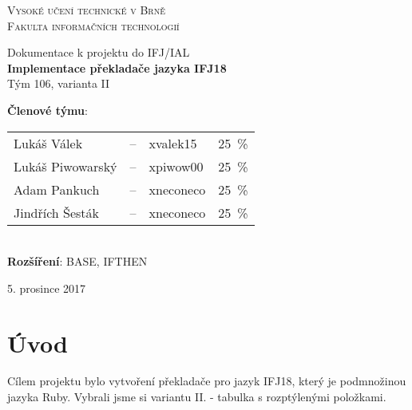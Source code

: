 \documentclass[11pt, a4paper]{article}
\begin{document}
\begin{titlepage}
\begin{center}
  
{\Huge \textsc{Vysoké učení technické v Brně \\
\vspace{0.5em}
}}
{\huge   \textsc{Fakulta informačních technologií}
}

\begin{LARGE}
Dokumentace k projektu do IFJ/IAL \\
\vspace{0.3em}
{\Huge \textbf{Implementace překladače jazyka IFJ18}} \\
\vspace{0.3em}
{\huge Tým 106, varianta II}  \\
\end{LARGE}



\end{center}

{\Large\begin{flushleft}
      \textbf{Členové týmu}: \vspace{-0.8em}
    \end{flushleft}

    \begin{tabular}{lclc}
Lukáš Válek      & -- & xvalek15   &  25 \,\% \\
Lukáš Piwowarský & -- & xpiwow00   &  25 \,\% \\
Adam Pankuch     & -- & xneconeco  &  25 \,\% \\
Jindřích Šesták  & -- & xneconeco  &  25 \,\%
    \end{tabular}} \\\vspace{0.3em}
    {\Large \textbf{Rozšíření}: BASE, IFTHEN} \\\vspace{0.3em}
    \begin{flushright}
      {\Large 5. prosince 2017}
    \end{flushright}
\end{titlepage}




\section{Úvod}
Cílem projektu bylo vytvoření překladače pro jazyk IFJ18, který je podmnožinou jazyka Ruby. Vybrali jsme si variantu II. - tabulka s rozptýlenými položkami.
\end{document}
